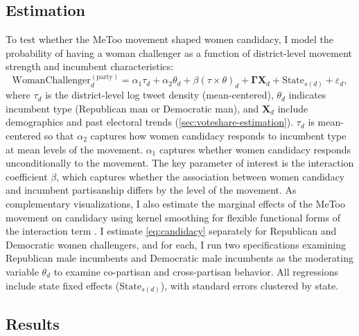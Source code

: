 \documentclass[manuscript,screen,nonacm,11pt,acm]{acmart}
\begin{document}
\subsection{Estimation}
\label{sec:candidacy-estimation}
To test whether the MeToo movement shaped women candidacy,  I model the probability of having a woman challenger as a function of district-level movement strength and incumbent characteristics:
\begin{equation}
\label{eq:candidacy}
\text{WomanChallenger}_{d}^{(\text{party})} = 
\alpha_1 \tau_d + 
\alpha_2 \theta_d + 
\beta (\tau \times \theta)_d + 
\bm{\Gamma} \bm{X}_d + 
\text{State}_{s(d)} + 
\varepsilon_{d},
\end{equation}
where $\tau_d$ is the district-level log tweet density (mean-centered),
$\theta_d$ indicates incumbent type (Republican man or Democratic man), and
$\bm{X}_d$ include demographics and past electoral trends (\cref{sec:voteshare-estimation}).
$\tau_d$ is mean-centered so that $\alpha_2$ captures how women candidacy responds to incumbent type at mean levels of the movement.
$\alpha_1$ captures whether women candidacy responds unconditionally to the movement.
The key parameter of interest is the interaction coefficient $\beta$, which captures whether the association between women candidacy and incumbent partisanship differs by the level of the movement.
As complementary visualizations, I also estimate the marginal effects of the MeToo movement on candidacy using kernel smoothing for flexible functional forms of the interaction term \citep{interflex}.
I estimate \cref{eq:candidacy} separately for Republican and Democratic women challengers, and for each, I run two specifications examining Republican male incumbents and Democratic male incumbents as the moderating variable $\theta_d$ to examine co-partisan and cross-partisan behavior.
All regressions include state fixed effects ($\text{State}_{s(d)}$), with standard errors clustered by state.

\subsection{Results}
\label{sec:candidacy-results}
\end{document}
